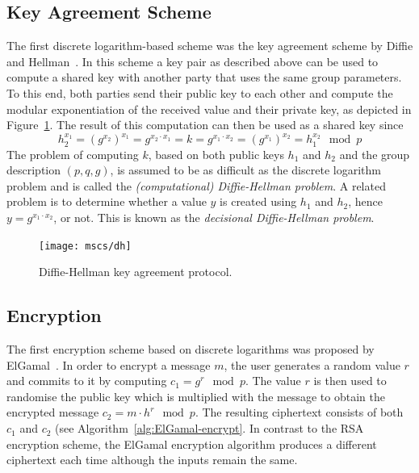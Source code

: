 \subsection{Key Agreement Scheme}

The first discrete logarithm-based scheme was the key agreement scheme by Diffie
and Hellman~\cite{DH1976}. In this scheme a key pair as described above can be
used to compute a shared key with another party that uses the same group
parameters. To this end, both parties send their public key to each other and
compute the modular exponentiation of the received value and their private key,
as depicted in Figure~\ref{msc:DH}. The result of this computation can then be
used as a shared key since
\begin{equation*}
  h_2^{x_1} = (g^{x_2})^{x_1} = g^{x_2 \cdot x_1}
  = k = g^{x_1 \cdot x_2} = (g^{x_1})^{x_2} = h_1^{x_2} \mod p
\end{equation*}
The problem of computing $k$, based on both public keys $h_1$ and $h_2$ and the
group description $(p, q, g)$, is assumed to be as difficult as the discrete
logarithm problem and is called the \emph{(computational) Diffie-Hellman problem}. A related
problem is to determine whether a value $y$ is created using $h_1$ and $h_2$,
hence $y = g^{x_1 \cdot x_2}$, or not. This is known as the \emph{decisional
Diffie-Hellman problem}.

\begin{figure}[hb]
  \centering
  \texttt{[image: mscs/dh]}
  \caption{Diffie-Hellman key agreement protocol.}
  \label{msc:DH}
\end{figure}

\subsection{Encryption}

The first encryption scheme based on discrete logarithms was proposed by
ElGamal~\cite{ElGamal1985}. In order to encrypt a message $m$, the user
generates a random value $r$ and commits to it by computing $c_1 = g^r \mod p$.
The value $r$ is then used to randomise the public key which is multiplied with
the message to obtain the encrypted message $c_2 = m \cdot h^r \mod p$. The
resulting ciphertext consists of both $c_1$ and $c_2$ (see Algorithm~\ref{alg:ElGamal-encrypt}.
In contrast to the RSA encryption scheme, the ElGamal encryption algorithm
produces a different ciphertext each time although the inputs remain the same.

